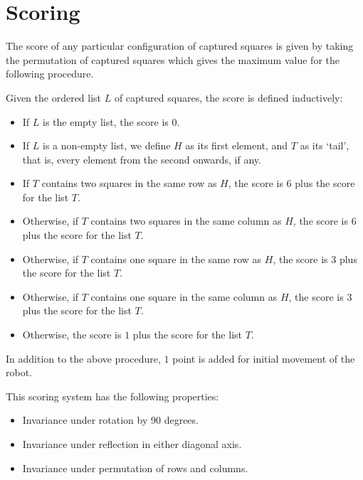 \section{Scoring}
\label{sec:scoring}

The score of any particular configuration of captured squares is given
by taking the permutation of captured squares which gives the maximum
value for the following procedure.

Given the ordered list $L$ of captured squares, the score is defined
inductively:

\begin{itemize}
  \item If $L$ is the empty list, the score is $0$.

  \item If $L$ is a non-empty list, we define $H$ as its first element, and
  $T$ as its `tail', that is, every element from the second onwards, if any.

  \item If $T$ contains two squares in the same row as $H$, the score is $6$
  plus the score for the list $T$.

  \item Otherwise, if $T$ contains two squares in the same column as $H$,
  the score is $6$ plus the score for the list $T$.

  \item Otherwise, if $T$ contains one square in the same row as $H$, the
  score is $3$ plus the score for the list $T$.

  \item Otherwise, if $T$ contains one square in the same column as $H$,
  the score is $3$ plus the score for the list $T$.

  \item Otherwise, the score is $1$ plus the score for the list $T$.
\end{itemize}

In addition to the above procedure, $1$ point is added for initial movement
of the robot.

This scoring system has the following properties:
\begin{itemize}
  \item Invariance under rotation by 90 degrees.
  \item Invariance under reflection in either diagonal axis.
  \item Invariance under permutation of rows and columns.
\end{itemize}

